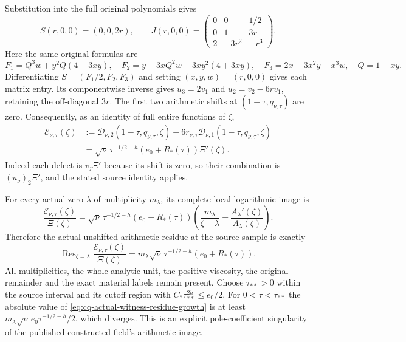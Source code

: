 Substitution into the full original polynomials gives
\[
 S(r,0,0)=(0,0,2r),\qquad
 J(r,0,0)=
 \begin{pmatrix}
 0&0&1/2\\
 0&1&3r\\
 2&-3r^2&-r^3
 \end{pmatrix}.
\]
Here the same original formulas are
\[
 F_1=Q^3w+y^2Q(4+3xy),\quad
 F_2=y+3xQ^2w+3xy^2(4+3xy),\quad
 F_3=2x-3x^2y-x^3w,\quad Q=1+xy.
\]
Differentiating $S=(F_1/2,F_2,F_3)$ and setting $(x,y,w)=(r,0,0)$
gives each matrix entry. Its componentwise inverse gives
$u_3=2v_1$ and $u_2=v_2-6rv_1$, retaining the off-diagonal $3r$.
The first two arithmetic shifts at $(1-\tau,q_{\nu,\tau})$ are zero.
Consequently, as an identity of full entire functions of $\zeta$,
\begin{equation}
\begin{split}
 \mathcal E_{\nu,\tau}(\zeta)
 &:=\mathcal D_{\nu,2}(1-\tau,q_{\nu,\tau},\zeta)
       -6r_{\nu,\tau}
          \mathcal D_{\nu,1}(1-\tau,q_{\nu,\tau},\zeta)\\
 &=\sqrt\nu\,\tau^{-1/2-h}
                    (e_0+R_*(\tau))\Xi'(\zeta).
\end{split}
 \label{eq:cq-actual-witness-entire-defect}
\end{equation}
Indeed each defect is $v_j\Xi'$ because its shift is zero, so their
combination is $(u_\nu)_2\Xi'$, and the stated source identity applies.

For every actual zero $\lambda$ of multiplicity $m_\lambda$, its
complete local logarithmic image is
\begin{equation}
 \frac{\mathcal E_{\nu,\tau}(\zeta)}{\Xi(\zeta)}
 =\sqrt\nu\,\tau^{-1/2-h}(e_0+R_*(\tau))
     \left(\frac{m_\lambda}{\zeta-\lambda}
                    +\frac{A_\lambda'(\zeta)}{A_\lambda(\zeta)}\right).
 \label{eq:cq-actual-witness-meromorphic-defect}
\end{equation}
Therefore the actual unshifted arithmetic residue at the source
sample is exactly
\begin{equation}
 \operatorname{Res}_{\zeta=\lambda}
       \frac{\mathcal E_{\nu,\tau}(\zeta)}{\Xi(\zeta)}
 =m_\lambda\sqrt\nu\,\tau^{-1/2-h}
                           (e_0+R_*(\tau)).
 \label{eq:cq-actual-witness-residue-growth}
\end{equation}
All multiplicities, the whole analytic unit, the positive viscosity,
the original remainder and the exact material labels remain present.
Choose $\tau_{**}>0$ within the source interval and its cutoff region
with $C_*\tau_{**}^{2h}\leq e_0/2$. For $0<\tau<\tau_{**}$ the
absolute value of \eqref{eq:cq-actual-witness-residue-growth} is at
least $m_\lambda\sqrt\nu\,e_0\tau^{-1/2-h}/2$, which diverges.
This is an explicit pole-coefficient singularity of the published
constructed field's arithmetic image.

